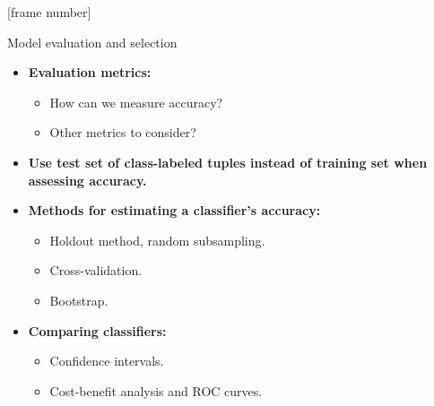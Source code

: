 \documentclass[aspectratio=169,t,table]{beamer}
\begin{document}
  {
    [frame number]
    \begin{frame}{Model evaluation and selection}
        \begin{itemize}
          \item \textbf{Evaluation metrics:}
          \begin{itemize}
            \item How can we measure accuracy?
            \item Other metrics to consider?
          \end{itemize}
          \item \textbf{Use {\color{airforceblue}test} set of class-labeled tuples instead of training set when assessing accuracy.}
          \item \textbf{Methods for estimating a classifier's accuracy:}
          \begin{itemize}
            \item Holdout method, random subsampling.
            \item Cross-validation.
            \item Bootstrap.
          \end{itemize}
          \item \textbf{Comparing classifiers:}
          \begin{itemize}
            \item Confidence intervals.
            \item Cost-benefit analysis and ROC curves.
          \end{itemize}
        \end{itemize}
    \end{frame}
  }
\end{document}
